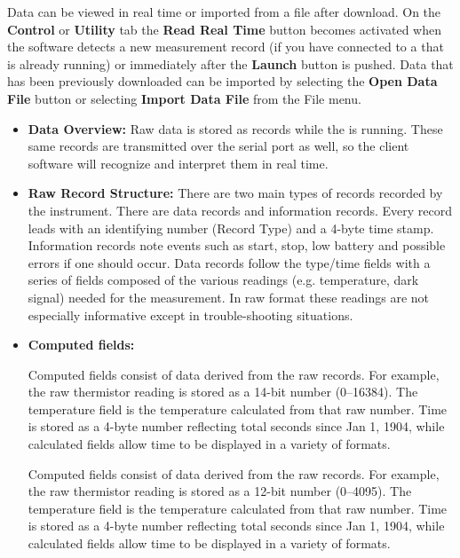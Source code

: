 \else			%

Data can be viewed in real time or imported from a file after download. On the \textbf{Control} or \textbf{Utility} tab the \textbf{Read Real Time} button becomes activated when the software detects a new measurement record (if you have connected to a \instType{} that is already running) or immediately after the \textbf{Launch} button is pushed. Data that has been previously downloaded can be imported by selecting the \textbf{Open Data File} button or selecting \textbf{Import Data File} from the File menu.

\fi

\begin{itemize}
    \item[] \textbf{Data Overview:}
    Raw \instType{} data is stored as records while the \instType{} is running. These same records are transmitted over the serial port as well, so the client software will recognize and interpret them in real time.
    
    \item[] \textbf{Raw Record Structure:}
    There are two main types of records recorded by the instrument. There are data records and information records.  Every record leads with an identifying number (Record Type) and a 4-byte time stamp. Information records note events such as start, stop, low battery and possible errors if one should occur. Data records follow the type/time fields with a series of fields composed of the various readings (e.g. temperature, dark signal) needed for the measurement.  In raw format these readings are not especially informative except in trouble-shooting situations.
    
    \item[] \textbf{Computed fields:}

    \ifcase \inst	%
    
    Computed fields consist of data derived from the raw records. For example, the raw thermistor reading is stored as a 14-bit number (0--16384). The temperature field is the temperature calculated from that raw number. Time is stored as a 4-byte number reflecting total seconds since Jan 1, 1904, while calculated fields allow time to be displayed in a variety of formats.
    
    \else		%
    
        Computed fields consist of data derived from the raw records. For example, the raw thermistor reading is stored as a 12-bit number (0--4095). The temperature field is the temperature calculated from that raw number. Time is stored as a 4-byte number reflecting total seconds since Jan 1, 1904, while calculated fields allow time to be displayed in a variety of formats.
    

\end{itemize}

